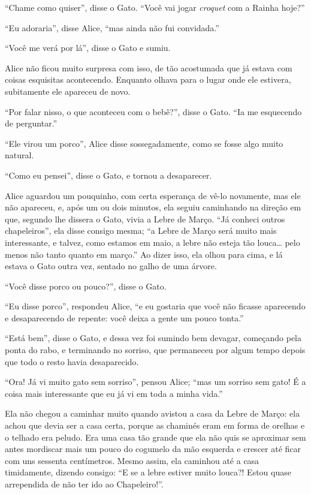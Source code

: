 ``Chame como quiser'', disse o Gato. ``Você vai jogar \textit{croquet} com a
Rainha hoje?''

``Eu adoraria'', disse Alice, ``mas ainda não fui convidada.''

``Você me verá por lá'', disse o Gato e sumiu.

Alice não ficou muito surpresa com isso, de tão acostumada que já estava
com coisas esquisitas acontecendo. Enquanto olhava para o lugar onde ele
estivera, subitamente ele apareceu de novo.

``Por falar nisso, o que aconteceu com o bebê?'', disse o Gato. ``Ia me
esquecendo de perguntar.''

``Ele virou um porco'', Alice disse sossegadamente, como se fosse algo
muito natural.

``Como eu pensei'', disse o Gato, e tornou a desaparecer.

Alice aguardou um pouquinho, com certa esperança de vê-lo novamente, mas
ele não apareceu, e, após um ou dois minutos, ela seguiu caminhando na
direção em que, segundo lhe dissera o Gato, vivia a Lebre de Março. ``Já
conheci outros chapeleiros'', ela disse consigo mesma; ``a Lebre de
Março será muito mais interessante, e talvez, como estamos em maio, a
lebre não esteja tão louca\ldots{} pelo menos não tanto quanto em março.'' Ao
dizer isso, ela olhou para cima, e lá estava o Gato outra vez, sentado
no galho de uma árvore.

``Você disse porco ou pouco?'', disse o Gato.

``Eu disse porco'', respondeu Alice, ``e eu gostaria que você não
ficasse aparecendo e desaparecendo de repente: você deixa a gente um
pouco tonta.''

``Está bem'', disse o Gato, e dessa vez foi sumindo bem devagar,
começando pela ponta do rabo, e terminando no sorriso, que permaneceu
por algum tempo depois que todo o resto havia desaparecido.

``Ora! Já vi muito gato sem sorriso'', pensou Alice; ``mas um sorriso
sem gato! É a coisa mais interessante que eu já vi em toda a minha
vida.''

Ela não chegou a caminhar muito quando avistou a casa da Lebre de Março:
ela achou que devia ser a casa certa, porque as chaminés eram em forma
de orelhas e o telhado era peludo. Era uma casa tão grande que ela não
quis se aproximar sem antes mordiscar mais um pouco do cogumelo da mão
esquerda e crescer até ficar com uns sessenta centímetros. Mesmo assim,
ela caminhou até a casa timidamente, dizendo consigo: ``E se a lebre
estiver muito louca?! Estou quase arrependida de não ter ido ao
Chapeleiro!''.

